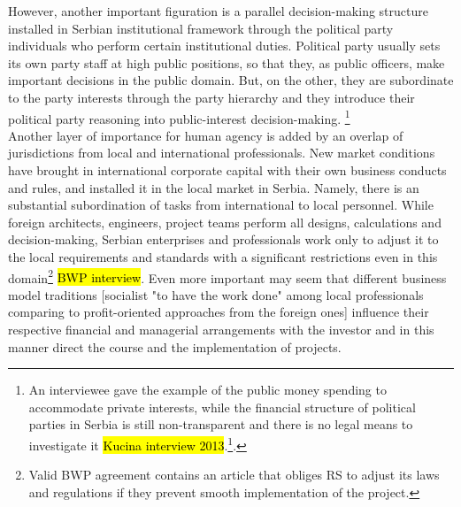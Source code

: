 \documentclass[11pt]{report}
\begin{document}
However, another important figuration is a parallel decision-making structure  installed in Serbian institutional framework through the political party individuals who perform certain institutional duties.
Political party usually sets its own party staff at high public positions, so that they, as public officers, make important decisions in the public domain.
But, on the other, they are subordinate to the party interests through the party hierarchy and they introduce their political party reasoning into public-interest decision-making. \footnote
{An interviewee gave the example of the public money spending to accommodate private interests,
while the financial structure of political parties in Serbia is still non-transparent and there is no legal means to investigate it \hl{Kucina interview 2013}.\footnote{
Another gave the example how a professional in high education had slowly changed his approach to the job during his term as a high officer of the political party in power \hl{Association of architects interview}.}.}
\\
Another layer of importance for human agency is added by an overlap of jurisdictions from local and international professionals.
New market conditions have brought in international corporate capital with their own business conducts and rules, and installed it in the local market in Serbia. Namely, there is an substantial subordination of tasks from international to local personnel.
While foreign architects, engineers, project teams perform all designs, calculations and decision-making, Serbian enterprises and professionals work only to adjust it to the local requirements and standards with a significant restrictions even in this domain\footnote{Valid BWP agreement contains an article that obliges RS to adjust its laws and regulations if they prevent smooth implementation of the project.}  \hl{BWP interview}.
Even more important may seem that different business model traditions [socialist "to have the work done" among local professionals comparing to profit-oriented approaches from the foreign ones]
influence their respective financial and managerial arrangements with the investor and in this manner direct the course and the implementation of projects.
\end{document}
